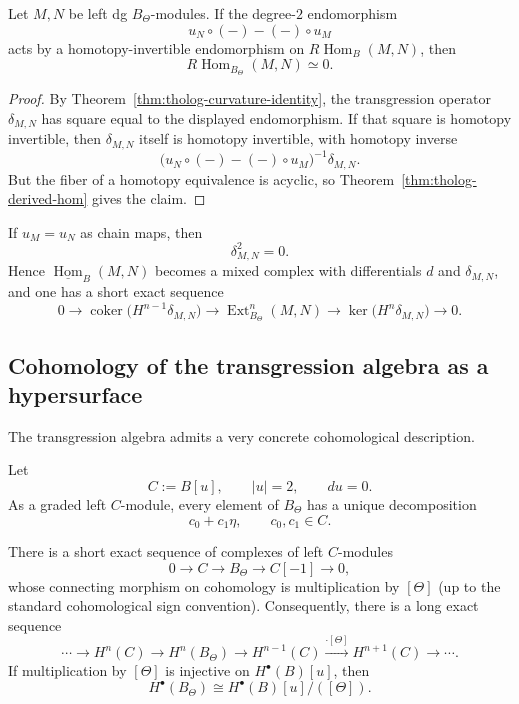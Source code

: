 \begin{corollary}
Let \(M,N\) be left dg \(B_{\Theta}\)-modules.
If the degree-\(2\) endomorphism
\[
u_{N}\circ(-)-(-)\circ u_{M}
\]
acts by a homotopy-invertible endomorphism on \(R\!\operatorname{Hom}_{B}(M,N)\), then
\[
R\!\operatorname{Hom}_{B_{\Theta}}(M,N)\simeq 0.
\]
\end{corollary}

\begin{proof}
By Theorem~\ref{thm:tholog-curvature-identity}, the transgression operator \(\delta_{M,N}\) has square equal to the displayed endomorphism.
If that square is homotopy invertible, then \(\delta_{M,N}\) itself is homotopy invertible, with homotopy inverse
\[
\big(u_{N}\circ(-)-(-)\circ u_{M}\big)^{-1}\delta_{M,N}.
\]
But the fiber of a homotopy equivalence is acyclic, so Theorem~\ref{thm:tholog-derived-hom} gives the claim.
\end{proof}

\begin{corollary}
If \(u_{M}=u_{N}\) as chain maps, then
\[
\delta_{M,N}^{2}=0.
\]
Hence \(\underline{\operatorname{Hom}}_{B}(M,N)\) becomes a mixed complex with differentials \(d\) and \(\delta_{M,N}\), and one has a short exact sequence
\[
0\longrightarrow
\operatorname{coker}\!\big(H^{n-1}\delta_{M,N}\big)
\longrightarrow
\operatorname{Ext}^{n}_{B_{\Theta}}(M,N)
\longrightarrow
\ker\!\big(H^{n}\delta_{M,N}\big)
\longrightarrow 0.
\]
\end{corollary}

\subsection{Cohomology of the transgression algebra as a hypersurface}

The transgression algebra admits a very concrete cohomological description.

Let
\[
C:=B[u],\qquad |u|=2,\qquad du=0.
\]
As a graded left \(C\)-module, every element of \(B_{\Theta}\) has a unique decomposition
\[
c_{0}+c_{1}\eta,
\qquad c_{0},c_{1}\in C.
\]

\begin{theorem}
There is a short exact sequence of complexes of left \(C\)-modules
\[
0\longrightarrow C
\longrightarrow B_{\Theta}
\longrightarrow C[-1]
\longrightarrow 0,
\]
whose connecting morphism on cohomology is multiplication by \([\Theta]\) (up to the standard cohomological sign convention).
Consequently, there is a long exact sequence
\[
\cdots\to
H^{n}(C)\to H^{n}(B_{\Theta})\to H^{n-1}(C)
\xrightarrow{\cdot[\Theta]}
H^{n+1}(C)\to\cdots.
\]
If multiplication by \([\Theta]\) is injective on \(H^{\bullet}(B)[u]\), then
\[
H^{\bullet}(B_{\Theta})\cong H^{\bullet}(B)[u]/([\Theta]).
\]
\end{theorem}

